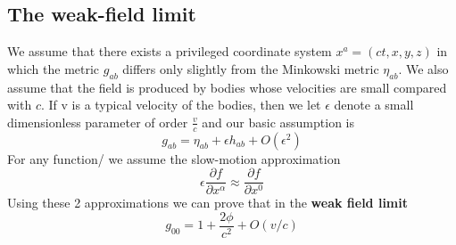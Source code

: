 \documentclass[12pt,a4paper]{article}
\numberwithin{table}{section}
\numberwithin{figure}{section}
\numberwithin{equation}{section}
\theoremstyle{remark}
\theoremstyle{definition}
\begin{document}
\subsection{The weak-field limit}
We assume that there exists a privileged coordinate system $x^a=(ct,x,y,z)$ in which the metric $g_{ab}$ differs only slightly from the Minkowski metric $\eta_{ab}$. We also assume that the field is produced by bodies whose velocities are small compared with $c$. If v is a typical velocity of the 
bodies, then we let $\epsilon$ denote a small dimensionless parameter of order $\frac{v}{c}$ and our basic assumption is 
\begin{equation}
    g_{ab}= \eta_{ab}+\epsilon h_{ab}+O(\epsilon^2)
\end{equation}
For any function/ we assume the slow-motion approximation
\begin{equation}
    \epsilon\dfrac{\partial f}{\partial x^\alpha}\approx\dfrac{\partial f}{\partial x^0}
\end{equation}
Using these 2 approximations we can prove that in the \textbf{weak field limit}
\begin{equation}
g_{00}=1+\dfrac{2\phi}{c^2}+O(v/c)    
\end{equation}
\end{document}
